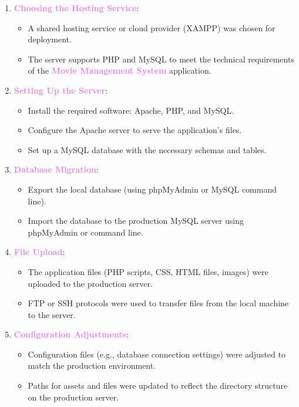 \documentclass[a4paper,12pt]{article}  %
\renewcommand{\textbf}[1]{\textcolor{violet}{\bfseries #1}}
\begin{document}
\begin{enumerate}
    \item \textbf{Choosing the Hosting Service}:
    \begin{itemize}
        \item A shared hosting service or cloud provider (XAMPP) was chosen for deployment.
        \item The server supports PHP and MySQL to meet the technical requirements of the \textbf{Movie Management System} application.
    \end{itemize}
    
    \item \textbf{Setting Up the Server}:
    \begin{itemize}
        \item Install the required software: Apache, PHP, and MySQL.
        \item Configure the Apache server to serve the application’s files.
        \item Set up a MySQL database with the necessary schemas and tables.
    \end{itemize}
    
    \item \textbf{Database Migration}:
    \begin{itemize}
        \item Export the local database (using phpMyAdmin or MySQL command line).
        \item Import the database to the production MySQL server using phpMyAdmin or command line.
    \end{itemize}
    
    \item \textbf{File Upload}:
    \begin{itemize}
        \item The application files (PHP scripts, CSS, HTML files, images) were uploaded to the production server.
        \item FTP or SSH protocols were used to transfer files from the local machine to the server.
    \end{itemize}
    
    \item \textbf{Configuration Adjustments}:
    \begin{itemize}
        \item Configuration files (e.g., database connection settings) were adjusted to match the production environment.
        \item Paths for assets and files were updated to reflect the directory structure on the production server.
    \end{itemize}
    

\end{enumerate}
\end{document}
